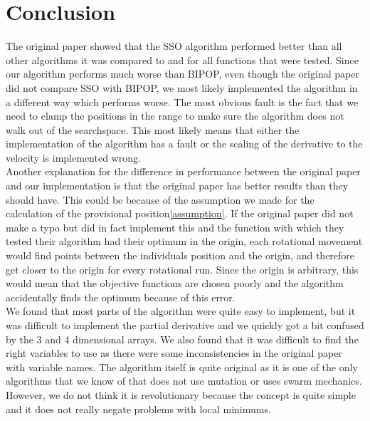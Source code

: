 \documentclass[runningheads]{llncs}
\begin{document}
\section{Conclusion}
The original paper showed that the SSO algorithm performed better than all other algorithms it was compared to and for all functions that were tested. Since our algorithm performs much worse than BIPOP, even though the original paper did not compare SSO with BIPOP, we most likely implemented the algorithm in a different way which performs worse. The most obvious fault is the fact that we need to clamp the positions in the range to make sure the algorithm does not walk out of the searchspace. This most likely means that either the implementation of the algorithm has a fault or the scaling of the derivative to the velocity is implemented wrong. \\
Another explanation for the difference in performance between the original paper and our implementation is that the original paper has better results than they should have. This could be because of the assumption we made for the calculation of the provisional position\ref{assumption}. If the original paper did not make a typo but did in fact implement this and the function with which they tested their algorithm had their optimum in the origin, each rotational movement would find points between the individuals position and the origin, and therefore get closer to the origin for every rotational run. Since the origin is arbitrary, this would mean that the objective functions are chosen poorly and the algorithm accidentally finds the optimum because of this error.\\
We found that most parts of the algorithm were quite easy to implement, but it was difficult to implement the partial derivative and we quickly got a bit confused by the 3 and 4 dimensional arrays. We also found that it was difficult to find the right variables to use as there were some inconsistencies in the original paper with variable names. The algorithm itself is quite original as it is one of the only algorithms that we know of that does not use mutation or uses swarm mechanics. However, we do not think it is revolutionary because the concept is quite simple and it does not really negate problems with local minimums. 



\end{document}
